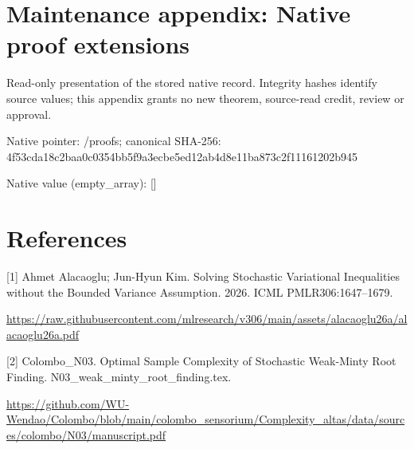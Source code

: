 \documentclass[10pt,a4paper]{article}
\begin{document}
\section{Maintenance appendix: Native proof extensions}


Read-only presentation of the stored native record. Integrity hashes identify source values; this appendix grants no new theorem, source-read credit, review or approval.



Native pointer: /proofs; canonical SHA-256: 4f53cda18c2baa0c0354bb5f\allowbreak{}9a3ecbe5ed12ab4d8e11ba87\allowbreak{}3c2f11161202b945



Native value (empty\_array): []



\section{References}


[1] Ahmet Alacaoglu; Jun-Hyun Kim. Solving Stochastic Variational Inequalities without the Bounded Variance Assumption. 2026. ICML PMLR306:1647--1679.



\url{https://raw.githubusercontent.com/mlresearch/v306/main/assets/alacaoglu26a/alacaoglu26a.pdf}



[2] Colombo\_N03. Optimal Sample Complexity of Stochastic Weak-Minty Root Finding. N03\_weak\_minty\_root\_finding.tex.



\url{https://github.com/WU-Wendao/Colombo/blob/main/colombo_sensorium/Complexity_altas/data/sources/colombo/N03/manuscript.pdf}
\end{document}
